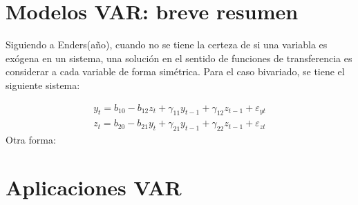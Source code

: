 \documentclass{article}
\begin{document}
\section{Modelos VAR: breve resumen}
Siguiendo a Enders(año), cuando no se tiene la certeza de si una variabla es exógena en un sistema, 
una solución en el sentido de funciones de transferencia es considerar a cada variable de forma simétrica.
Para el caso bivariado, se tiene el siguiente sistema:

\begin{eqnarray}
    y_{t}=b_{10}-b_{12}z_t+\gamma _{11}y_{t-1}+\gamma _{12}z_{t-1}+\varepsilon _{yt} \\
    z_{t}=b_{20}-b_{21}y_{t}+\gamma _{21}y_{t-1}+\gamma _{22}z_{t-1}+\varepsilon _{zt}
\end{eqnarray}
Otra forma: 


\section{Aplicaciones VAR}

\end{document}
